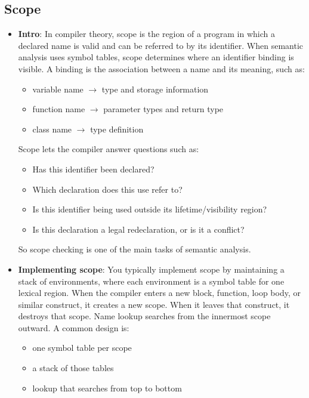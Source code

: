 \documentclass{report}
\begin{document}
    \subsection{Scope}
    \begin{itemize}
        \item \textbf{Intro}: In compiler theory, scope is the region of a program in which a declared name is valid and can be referred to by its identifier.
            \bigbreak \noindent 
            When semantic analysis uses symbol tables, scope determines where an identifier binding is visible. A binding is the association between a name and its meaning, such as:
            \begin{itemize}
                \item variable name $\to$ type and storage information
                \item function name $\to$ parameter types and return type
                \item class name $\to$ type definition
            \end{itemize}
            Scope lets the compiler answer questions such as:
            \begin{itemize}
                \item Has this identifier been declared?
                \item Which declaration does this use refer to?
                \item Is this identifier being used outside its lifetime/visibility region?
                \item Is this declaration a legal redeclaration, or is it a conflict?
            \end{itemize}
            So scope checking is one of the main tasks of semantic analysis.
        \item \textbf{Implementing scope}: You typically implement scope by maintaining a stack of environments, where each environment is a symbol table for one lexical region.
            \bigbreak \noindent 
            When the compiler enters a new block, function, loop body, or similar construct, it creates a new scope. When it leaves that construct, it destroys that scope. Name lookup searches from the innermost scope outward.
            \bigbreak \noindent 
            A common design is:
            \begin{itemize}
                \item one symbol table per scope
                \item a stack of those tables
                \item lookup that searches from top to bottom
            \end{itemize}
    \end{itemize}
\end{document}
